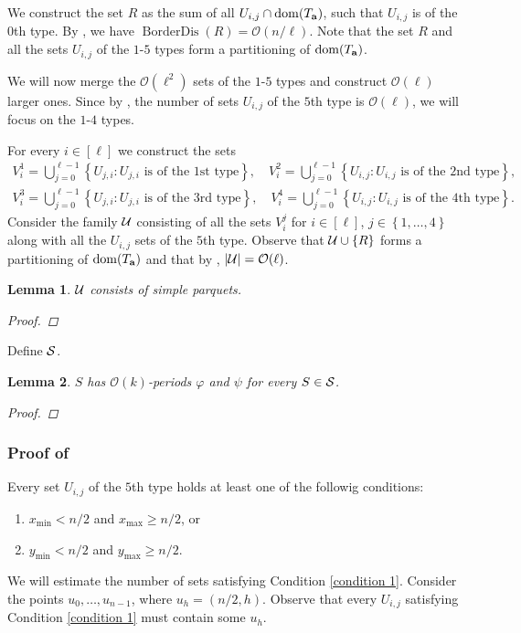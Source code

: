 \documentclass[11pt]{article}
\renewcommand{\O}{\mathcal{O}}
\renewcommand{\phi}{\varphi}
\newcommand{\set}[1]{\left\lbrace #1 \right\rbrace}
\newcommand{\eq}[1]{\begin{align*} #1 \end{align*}}
\theoremstyle{plain}
\newtheorem{lemma}{Lemma}
\theoremstyle{definition}
\theoremstyle{remark}
\DeclareMathOperator*{\BD}{BorderDis}
\begin{document}
We construct the set $R$ as the sum of all $U_{i, j} \cap \d{\Ta}$, such that $U_{i, j}$ is of the $0$th type.
By , we have $\BD(R) = \O(n / \ell)$.
Note that the set $R$ and all the sets $U_{i, j}$ of the $1$-$5$ types form a partitioning of $\d{\Ta}$.

We will now merge the $\O(\ell^2)$ sets of the $1$-$5$ types and construct $\O(\ell)$ larger ones.
Since by , the number of sets $U_{i, j}$ of the $5$th type is $\O(\ell)$, we will focus on the $1$-$4$ types.

For every $i \in [\ell]$ we construct the sets
\eq{
	V^1_i = \bigcup_{j = 0}^{\ell - 1} \set{U_{j, i} : U_{j, i} \text{ is of the $1$st type}}, \quad
	V^2_i = \bigcup_{j = 0}^{\ell - 1} \set{U_{i, j} : U_{i, j} \text{ is of the $2$nd type}}, \\
	V^3_i = \bigcup_{j = 0}^{\ell - 1} \set{U_{j, i} : U_{j, i} \text{ is of the $3$rd type}}, \quad
	V^4_i = \bigcup_{j = 0}^{\ell - 1} \set{U_{i, j} : U_{i, j} \text{ is of the $4$th type}}.
}
Consider the family $\U$ consisting of all the sets $V^j_i$ for $i \in [\ell]$, $j \in \set{1, \dots, 4}$ along with all the $U_{i, j}$ sets of the $5$th type.
Observe that $\U \cup \set{R}$ forms a partitioning of $\d{\Ta}$ and that by , $|\U| = \O(\ell)$.

\begin{lemma}
	$\U$ consists of simple parquets.
	\begin{proof}
	\end{proof}
\end{lemma}

Define $\S$.

\begin{lemma}
	$S$ has $\O(k)$-periods $\phi$ and $\psi$ for every $S \in \S$.
	\begin{proof}
	\end{proof}
\end{lemma}

\subsubsection{Proof of } \label{type 5 bound proof}
Every set $U_{i, j}$ of the $5$th type holds at least one of the followig conditions:
\begin{enumerate}
	\item $x_{\min} < n / 2$ and $x_{\max} \ge n / 2$, or \label{condition 1}
	\item $y_{\min} < n / 2$ and $y_{\max} \ge n / 2$.
\end{enumerate}
We will estimate the number of sets satisfying Condition \ref{condition 1}.
Consider the points $u_0, \dots, u_{n - 1}$, where $u_h = (n / 2, h)$.
Observe that every $U_{i, j}$ satisfying Condition \ref{condition 1} must contain some $u_h$.





\end{document}
